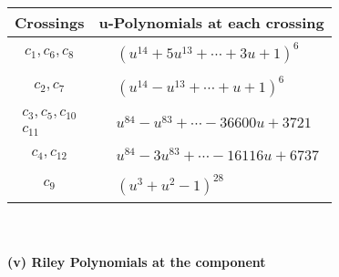 \documentclass[1p]{elsarticle_modified}
\theoremstyle{definition}
\begin{document}
\begin{tabular}{m{50pt}|m{274pt}}
Crossings & \hspace{64pt}u-Polynomials at each crossing \\
\hline $$\begin{aligned}c_{1},c_{6},c_{8}\end{aligned}$$&$\begin{aligned}
&(u^{14}+5 u^{13}+\cdots+3 u+1)^{6}
\end{aligned}$\\
\hline $$\begin{aligned}c_{2},c_{7}\end{aligned}$$&$\begin{aligned}
&(u^{14}- u^{13}+\cdots+u+1)^{6}
\end{aligned}$\\
\hline $$\begin{aligned}c_{3},c_{5},c_{10}\\c_{11}\end{aligned}$$&$\begin{aligned}
&u^{84}- u^{83}+\cdots-36600 u+3721
\end{aligned}$\\
\hline $$\begin{aligned}c_{4},c_{12}\end{aligned}$$&$\begin{aligned}
&u^{84}-3 u^{83}+\cdots-16116 u+6737
\end{aligned}$\\
\hline $$\begin{aligned}c_{9}\end{aligned}$$&$\begin{aligned}
&(u^3+u^2-1)^{28}
\end{aligned}$\\
\hline
\end{tabular}\\~\\
\newpage\renewcommand{\arraystretch}{1}
\flushleft \textbf{(v) Riley Polynomials at the component}\newline \\
\end{document}
